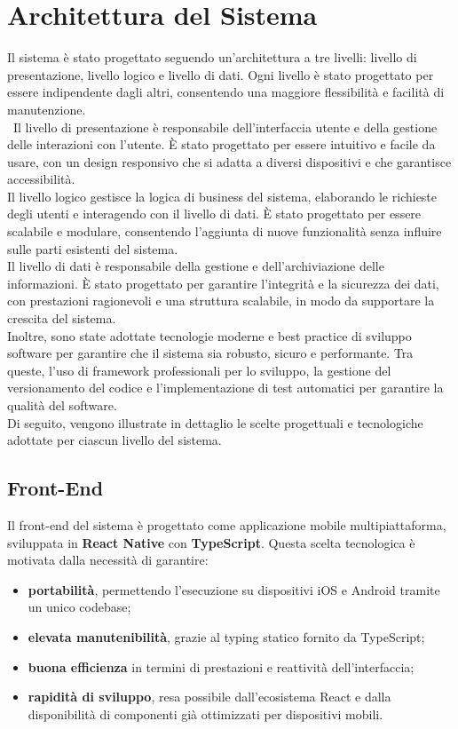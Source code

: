 \documentclass{book}
\begin{document}
\section{Architettura del Sistema}
Il sistema è stato progettato seguendo un'architettura a tre livelli: livello di presentazione, livello logico e livello di dati. Ogni livello è stato progettato per essere indipendente dagli altri, consentendo una maggiore flessibilità e facilità di manutenzione.\\\
Il livello di presentazione è responsabile dell'interfaccia utente e della gestione delle interazioni con l'utente. È stato progettato per essere intuitivo e facile da usare, con un design responsivo che si adatta a diversi dispositivi e che garantisce accessibilità.\\
Il livello logico gestisce la logica di business del sistema, elaborando le richieste degli utenti e interagendo con il livello di dati. È stato progettato per essere scalabile e modulare, consentendo l'aggiunta di nuove funzionalità senza influire sulle parti esistenti del sistema.\\
Il livello di dati è responsabile della gestione e dell'archiviazione delle informazioni. È stato progettato per garantire l'integrità e la sicurezza dei dati, con prestazioni ragionevoli e una struttura scalabile, in modo da supportare la crescita del sistema.\\
Inoltre, sono state adottate tecnologie moderne e best practice di sviluppo software per garantire che il sistema sia robusto, sicuro e performante. Tra queste, l'uso di framework professionali per lo sviluppo, la gestione del versionamento del codice e l'implementazione di test automatici per garantire la qualità del software.\\
Di seguito, vengono illustrate in dettaglio le scelte progettuali e tecnologiche adottate per ciascun livello del sistema.

\newpage
\subsection{Front-End}

Il front-end del sistema è progettato come applicazione mobile multipiattaforma, sviluppata in \textbf{React Native} con \textbf{TypeScript}. Questa scelta tecnologica è motivata dalla necessità di garantire:
\begin{itemize}
    \item \textbf{portabilità}, permettendo l’esecuzione su dispositivi iOS e Android tramite un unico codebase;
    \item \textbf{elevata manutenibilità}, grazie al typing statico fornito da TypeScript;
    \item \textbf{buona efficienza} in termini di prestazioni e reattività dell’interfaccia;
    \item \textbf{rapidità di sviluppo}, resa possibile dall’ecosistema React e dalla disponibilità di componenti già ottimizzati per dispositivi mobili.
\end{itemize}
\end{document}
